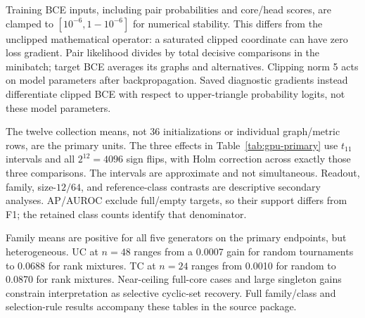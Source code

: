 Training BCE inputs, including pair probabilities and core/head scores, are clamped to $[10^{-6},1-10^{-6}]$ for numerical stability. This differs from the unclipped mathematical operator: a saturated clipped coordinate can have zero loss gradient. Pair likelihood divides by total decisive comparisons in the minibatch; target BCE averages its graphs and alternatives. Clipping norm 5 acts on model parameters after backpropagation. Saved diagnostic gradients instead differentiate clipped BCE with respect to upper-triangle probability logits, not these model parameters.

\begin{table}[H]\centering\small

\caption{Complete-system descriptive mean F1 with absolute calibration. ``Struct.'' uses the relevant TC/UC operator; ``head'' is the model's own supervised membership output. Each readout receives its own development selection. Relational control has 128 extra parameters.}
\label{tab:gpu-systems}\end{table}

\begingroup\footnotesize

\endgroup

The twelve collection means, not 36 initializations or individual graph/metric rows, are the primary units. The three effects in Table~\ref{tab:gpu-primary} use $t_{11}$ intervals and all $2^{12}=4096$ sign flips, with Holm correction across exactly those three comparisons. The intervals are approximate and not simultaneous. Readout, family, size-$12/64$, and reference-class contrasts are descriptive secondary analyses. AP/AUROC exclude full/empty targets, so their support differs from F1; the retained class counts identify that denominator.

\begin{table}[ht]\centering\small

\caption{Descriptive common-structural-readout effects by reference-core class. Within-class means average graphs/initializations and then twelve collections. These are inspected strata, not extra primary endpoints.}
\label{tab:gpu-core-classes}\end{table}

Family means are positive for all five generators on the primary endpoints, but heterogeneous. UC at $n=48$ ranges from a 0.0007 gain for random tournaments to 0.0688 for rank mixtures. TC at $n=24$ ranges from 0.0010 for random to 0.0870 for rank mixtures. Near-ceiling full-core cases and large singleton gains constrain interpretation as selective cyclic-set recovery. Full family/class and selection-rule results accompany these tables in the source package.

